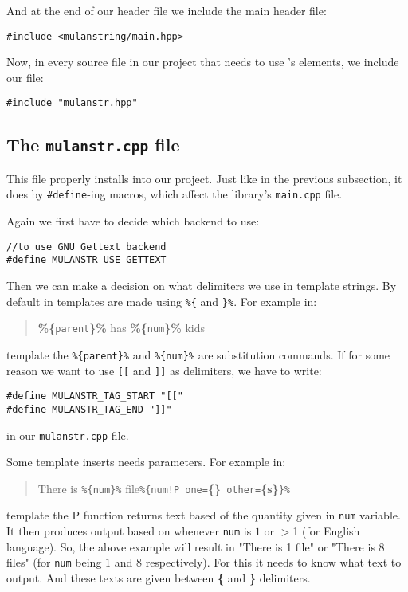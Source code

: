 And at the end of our header file we include the \mulan{} main header file:
\begin{verbatim}
#include <mulanstring/main.hpp>
\end{verbatim}

Now, in every source file in our project that needs to use \mulan{}'s elements, we include our file:
\begin{verbatim}
#include "mulanstr.hpp"
\end{verbatim}

\subsection{The \texttt{mulanstr.cpp} file}
This file properly installs \mulan{} into our project. 
Just like in the previous subsection, it does by \verb+#define+-ing macros, which affect the library's \verb+main.cpp+ file.

Again we first have to decide which backend to use:
\begin{verbatim}
//to use GNU Gettext backend
#define MULANSTR_USE_GETTEXT
\end{verbatim}

Then we can make a decision on what delimiters we use in template strings. 
By default in \mulan{} templates are made using \verb+%{+ and \verb+}%+. For example in:
\begin{quotation}
	\textbf{\%\{}\texttt{parent}\textbf{\}\%} has \textbf{\%\{}\texttt{num}\textbf{\}\%} kids
\end{quotation}
template the \verb+%{parent}%+ and \verb+%{num}%+ are substitution commands. 
If for some reason we want to use \verb+[[+ and \verb+]]+ as delimiters, we have to write:
\begin{verbatim}
#define MULANSTR_TAG_START "[["
#define MULANSTR_TAG_END "]]"
\end{verbatim} in our \texttt{mulanstr.cpp} file.

Some template inserts needs parameters. For example in:
\begin{quotation}
	There is \verb+%{num}%+ file\verb+%{num!P one=+\textbf{\{\}}\verb+ other=+\textbf{\{s\}}\verb+}%+
\end{quotation}
template the \textsc{P} function returns text based of the quantity given in \texttt{num} variable. 
It then produces output based on whenever \texttt{num} is $1$ or $>$1 (for English language).
So, the above example will result in "There is 1 file" or "There is 8 files" (for \texttt{num} being $1$ and $8$ respectively).
For this it needs to know what text to output. And these texts are given between \textbf{\{} and \textbf{\}} delimiters.


